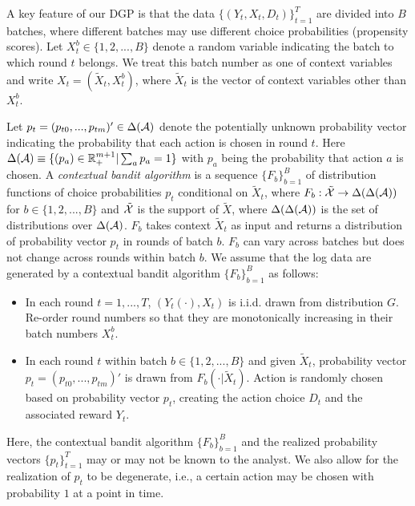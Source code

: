 \documentclass[letterpaper]{article} \usepackage{aaai19}  \usepackage{times}  \usepackage{helvet}  \usepackage{courier}  \usepackage{url}  \usepackage{graphicx}  \frenchspacing  \usepackage{comment}
\begin{document}
A key feature of our DGP is that the data $\{(Y_t,X_t,D_t)\}_{t=1}^T$ are divided into $B$ batches, where different batches may use different choice probabilities (propensity scores). 
Let $X_t^b\in\{1,2,...,B\}$ denote a random variable indicating the batch to which round $t$ belongs.
We treat this batch number as one of context variables and write $X_t=(\tilde{X}_t,X_t^b)$, where $\tilde X_t$ is the vector of context variables other than $X_t^b$. 


Let $p_t=(p_{t0},...,p_{tm})'\in \Delta({\cal A})$ denote the potentially unknown probability vector indicating the probability that each action is chosen in round $t$. 
Here $\Delta({\cal A})\equiv\{(p_a)\in\mathbb{R}^{m+1}_{+}| \sum_a p_a=1\}$ with $p_a$ being the probability that action $a$ is chosen. 
A {\it contextual bandit algorithm} is a sequence $\{F_b\}_{b=1}^B$ of distribution functions of choice probabilities $p_t$ conditional on $\tilde X_t$, where $F_b: \tilde{\cal X}\rightarrow \Delta(\Delta({\cal A}))$ for $b\in\{1,2,...,B\}$ and $\tilde{\cal X}$ is the support of $\tilde X$, where $\Delta(\Delta({\cal A}))$ is the set of distributions over $\Delta({\cal A})$.
$F_b$ takes context $\tilde X_t$ as input and returns a distribution of probability vector $p_t$ in rounds of batch $b$.
$F_b$ can vary across batches but does not change across rounds within batch $b$. 
We assume that the log data are generated by a contextual bandit algorithm $\{F_b\}_{b=1}^B$ as follows:

\begin{itemize}
\item In each round $t=1,...,T$, $(Y_t(\cdot),X_t)$ is i.i.d. drawn from distribution $G$. 
Re-order round numbers so that they are monotonically increasing in their batch numbers $X_t^b$. 
\item In each round $t$ within batch $b\in\{1,2,...,B\}$ and given $\tilde X_t$, probability vector $p_t=(p_{t0},...,p_{tm})'$ is drawn from $F_b(\cdot|\tilde X_t)$. 
Action is randomly chosen based on probability vector $p_t$, creating the action choice $D_{t}$ and the associated reward $Y_t$. 
\end{itemize}

\noindent Here, the contextual bandit algorithm $\{F_b\}_{b=1}^B$ and the realized probability vectors $\{p_t\}_{t=1}^T$ may or may not be known to the analyst. 
We also allow for the realization of $p_t$ to be degenerate, i.e., a certain action may be chosen with probability $1$ at a point in time.\\
\end{document}
